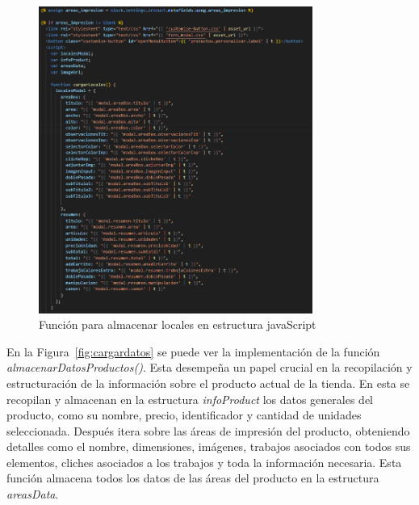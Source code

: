 \documentclass[12pt]{article}
\begin{document}
\begin{figure}[ht]
    \centering
    \includegraphics[width=0.8\textwidth]{imagenesUS3-section/funcioncargarLocales.png}
    \caption{\label{fig:cargarlocales} Función para almacenar locales en estructura javaScript}
    \vspace{\fill}
\end{figure}

En la Figura~\ref{fig:cargardatos} se puede ver la implementación de la función \textit{almacenarDatosProductos()}. Esta desempeña un papel crucial en 
la recopilación y estructuración de la información sobre el producto actual de la tienda. En esta se recopilan y almacenan en la estructura \textit{infoProduct} los datos generales del producto, como su nombre, precio, identificador y cantidad de
unidades seleccionada. Después itera sobre las áreas de impresión del producto, obteniendo detalles como el nombre, dimensiones, imágenes, trabajos asociados con todos sus elementos, cliches asociados a los trabajos y toda la información necesaria. Esta función
almacena todos los datos de las áreas del producto en la estructura \textit{areasData}.
\end{document}
